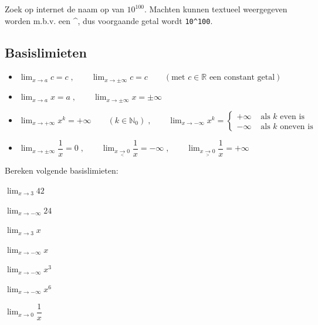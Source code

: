 \documentclass[12pt,twoside,a4paper]{article}
\begin{document}
Zoek op internet de naam op van $10^{100}$. Machten kunnen textueel weergegeven worden m.b.v. een \textasciicircum, dus voorgaande getal wordt \texttt{10\textasciicircum 100}.


\needspace{4cm}
\subsection{Basislimieten}

\begin{itemize}
\item $\displaystyle\lim_{x\to a}c=c\;,\qquad\lim_{x\to \pm\infty}c=c\qquad (\mbox{met } c\in\mathbb{R}\mbox{ een constant getal})$
\item $\displaystyle\lim_{x\to a}x=a\;,\qquad\lim_{x\to \pm\infty}x=\pm\infty$
\item $\displaystyle\lim_{x\to+\infty}x^k = +\infty\qquad(k\in\mathbb{N}_0)\;,\qquad \displaystyle\lim_{x\to-\infty}x^k = \begin{cases}+\infty &\mbox{ als $k$ even is}\\-\infty &\mbox{ als $k$ oneven is} \end{cases}$
\item $\displaystyle\lim_{x\to\pm\infty}\dfrac{1}{x}=0\;,\qquad\lim_{x\underset{<}{\to}0}\dfrac{1}{x}=-\infty\;,\qquad \displaystyle\lim_{x\underset{>}{\to}0}\dfrac{1}{x}=+\infty$
\end{itemize}

\begin{oefening}
  Bereken volgende basislimieten:
  \begin{exlist}{2}
  \item $\displaystyle \lim_{x\to 3}42$
  \item $\displaystyle \lim_{x\to -\infty}24$
  \item $\displaystyle \lim_{x\to 3}x$
  \item $\displaystyle \lim_{x\to -\infty}x$
  \item $\displaystyle \lim_{x\to -\infty}x^3$
  \item $\displaystyle \lim_{x\to -\infty}x^6$
  \item $\displaystyle \lim_{x\to 0}\dfrac{1}{x}$
  \end{exlist}
\end{oefening}
\end{document}
